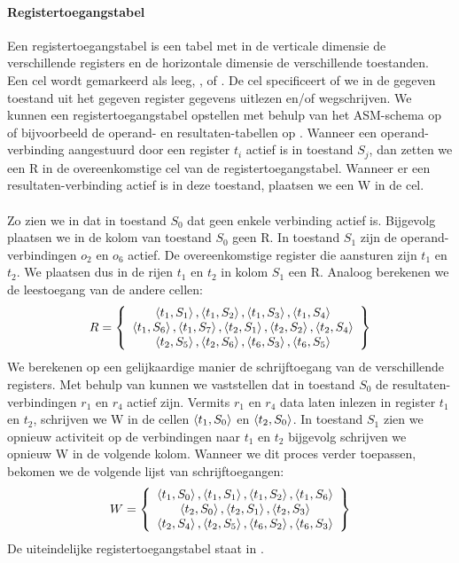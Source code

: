 \paragraph{Registertoegangstabel}Een registertoegangstabel is een tabel met in de verticale dimensie de verschillende registers en de horizontale dimensie de verschillende toestanden. Een cel wordt gemarkeerd als leeg, ,  of . De cel specificeert of we in de gegeven toestand uit het gegeven register gegevens uitlezen en/of wegschrijven. We kunnen een registertoegangstabel opstellen met behulp van het ASM-schema op  of bijvoorbeeld de operand- en resultaten-tabellen op . Wanneer een operand-verbinding aangestuurd door een register $t_i$ actief is in toestand $S_j$, dan zetten we een R in de overeenkomstige cel van de registertoegangstabel. Wanneer er een resultaten-verbinding actief is in deze toestand, plaatsen we een W in de cel.
\paragraph{}
Zo zien we in  dat in toestand $S_0$ dat geen enkele verbinding actief is. Bijgevolg plaatsen we in de kolom van toestand $S_0$ geen R. In toestand $S_1$ zijn de operand-verbindingen $o_2$ en $o_6$ actief. De overeenkomstige register die aansturen zijn $t_1$ en $t_2$. We plaatsen dus in de rijen $t_1$ en $t_2$ in kolom $S_1$ een R. Analoog berekenen we de leestoegang van de andere cellen:
\begin{equation}
R=\left\{ \begin{array}{c} 
\left\langle t_1,S_1 \right\rangle,\left\langle t_1,S_2 \right\rangle,\left\langle t_1,S_3 \right\rangle,\left\langle t_1,S_4 \right\rangle\\
\left\langle t_1,S_6 \right\rangle,\left\langle t_1,S_7 \right\rangle,\left\langle t_2,S_1 \right\rangle,\left\langle t_2,S_2 \right\rangle,\left\langle t_2,S_4 \right\rangle\\
\left\langle t_2,S_5 \right\rangle,\left\langle t_2,S_6 \right\rangle,\left\langle t_6,S_3 \right\rangle,\left\langle t_6,S_5 \right\rangle
 \end{array} \right\}
\end{equation}
We berekenen op een gelijkaardige manier de schrijftoegang van de verschillende registers. Met behulp van  kunnen we vaststellen dat in toestand $S_0$ de resultaten-verbindingen $r_1$ en $r_4$ actief zijn. Vermits $r_1$ en $r_4$ data laten inlezen in register $t_1$ en $t_2$, schrijven we W in de cellen $\left\langle t_1,S_0 \right\rangle$ en $\left\langle t_2,S_0 \right\rangle$. In toestand $S_1$ zien we opnieuw activiteit op de  verbindingen naar $t_1$ en $t_2$ bijgevolg schrijven we opnieuw W in de volgende kolom. Wanneer we dit proces verder toepassen, bekomen we de volgende lijst van schrijftoegangen:
\begin{equation}
W=\left\{ \begin{array}{c} 
\left\langle t_1,S_0 \right\rangle,\left\langle t_1,S_1 \right\rangle,\left\langle t_1,S_2 \right\rangle,\left\langle t_1,S_6 \right\rangle\\
\left\langle t_2,S_0 \right\rangle,\left\langle t_2,S_1 \right\rangle,\left\langle t_2,S_3 \right\rangle\\
\left\langle t_2,S_4 \right\rangle,\left\langle t_2,S_5 \right\rangle,\left\langle t_6,S_2 \right\rangle,\left\langle t_6,S_3 \right\rangle
 \end{array} \right\}
\end{equation}
De uiteindelijke registertoegangstabel staat in .

